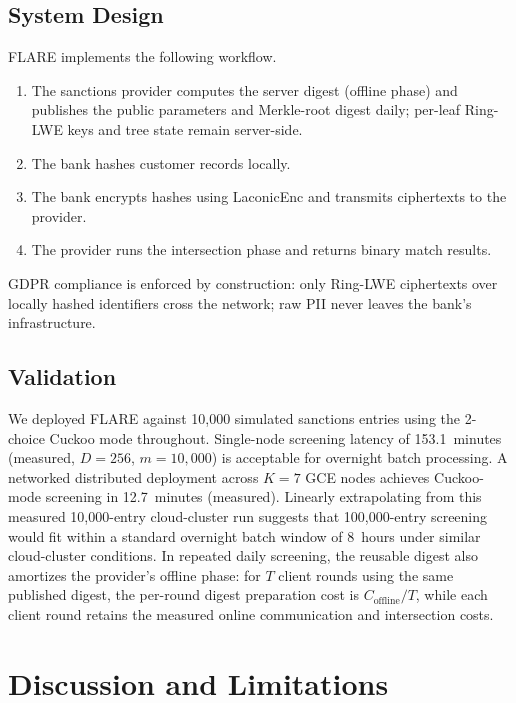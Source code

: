 \documentclass[preprint,12pt]{elsarticle}
\newcommand{\laconicenc}{\textsf{LaconicEnc}}
\begin{document}
\subsection{System Design}

FLARE implements the following workflow.
\begin{enumerate}[leftmargin=*]
  \item The sanctions provider computes the server digest (offline phase) and
        publishes the public parameters and Merkle-root digest daily;
        per-leaf Ring-LWE keys and tree state remain server-side.
  \item The bank hashes customer records locally.
  \item The bank encrypts hashes using \laconicenc{} and transmits ciphertexts
        to the provider.
  \item The provider runs the intersection phase and returns binary match results.
\end{enumerate}
GDPR compliance is enforced by construction: only Ring-LWE ciphertexts
over locally hashed identifiers cross the network; raw PII never leaves
the bank's infrastructure.

\subsection{Validation}

We deployed FLARE against 10{,}000 simulated sanctions entries using the
2-choice Cuckoo mode throughout. Single-node screening latency of
153.1~minutes (measured, $D=256$, $m=10{,}000$) is acceptable for overnight
batch processing. A networked distributed deployment across $K=7$ GCE nodes
achieves Cuckoo-mode screening in 12.7~minutes (measured). Linearly
extrapolating from this measured 10{,}000-entry cloud-cluster run suggests
that 100{,}000-entry screening would fit within a standard overnight batch
window of 8~hours under similar cloud-cluster conditions. In repeated daily
screening, the reusable digest also amortizes the provider's offline phase:
for $T$ client rounds using the same published digest, the per-round digest
preparation cost is $C_{\mathrm{offline}}/T$, while each client round retains
the measured online communication and intersection costs.

\section{Discussion and Limitations}
\label{sec:discussion}
\end{document}
